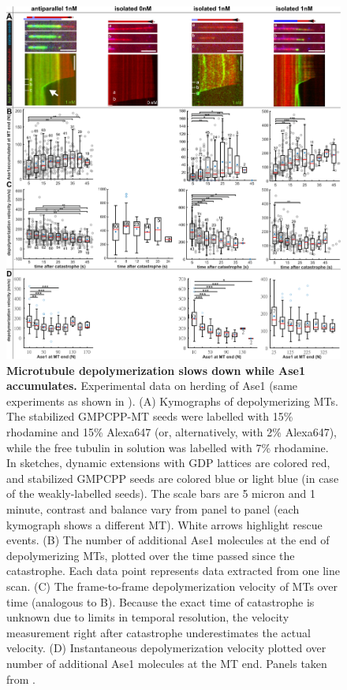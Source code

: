\begin{figure}[h!]
    \centering
    \includegraphics[width=1\linewidth]{Figures/ase2b.png}
    \caption[Microtubule depolymerization slows down while Ase1 accumulates.]{\textbf{Microtubule depolymerization slows down while Ase1 accumulates.} Experimental data on herding of Ase1 (same experiments as shown in ). (A) Kymographs of depolymerizing MTs. The stabilized GMPCPP-MT seeds were labelled with 15\% rhodamine and 15\% Alexa647 (or, alternatively, with 2\% Alexa647), while the free tubulin in solution was labelled with 7\% rhodamine. In sketches, dynamic extensions with GDP lattices are colored red, and stabilized GMPCPP seeds are colored blue or light blue (in case of the weakly-labelled seeds). The scale bars are 5 micron and 1 minute, contrast and balance vary from panel to panel (each kymograph shows a different MT). White arrows highlight rescue events. (B) The number of additional Ase1 molecules at the end of depolymerizing MTs, plotted over the time passed since the catastrophe. Each data point represents data extracted from one line scan. (C) The frame-to-frame depolymerization velocity of MTs over time (analogous to B). Because the exact time of catastrophe is unknown due to limits in temporal resolution, the velocity measurement right after catastrophe underestimates the actual velocity. (D) Instantaneous depolymerization velocity plotted over number of additional Ase1 molecules at the MT end. Panels taken from \cite{Krattenmacher2024}.
        }\label{ase2b}
\end{figure}

